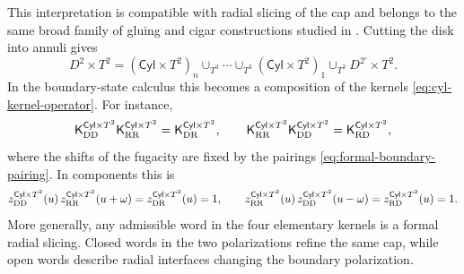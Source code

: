 \documentclass[11pt,a4paper]{article}
\numberwithin{equation}{section}
\theoremstyle{plain}
\theoremstyle{definition}
\theoremstyle{remark}
\newcommand{\cyl}{\mathsf{Cyl}}
\begin{document}
This interpretation is compatible with radial slicing of the cap and belongs to the same broad family of gluing and cigar constructions studied in \cite{Dedushenko:2018aox,Dedushenko:2018tgx,Dedushenko:2021mds,Dedushenko:2023qjq}.  Cutting the disk into annuli gives
\begin{equation}
D^2\times T^2
=
(\cyl\times T^2)_n
\cup_{T^3}\cdots\cup_{T^3}
(\cyl\times T^2)_1
\cup_{T^3}
D^{2\prime}\times T^2.
\label{eq:radial-slicing-cap}
\end{equation}
In the boundary-state calculus this becomes a composition of the kernels \eqref{eq:cyl-kernel-operator}.  For instance,
\begin{equation}
\mathsf K_{\rm DD}^{\cyl\times T^2}\mathsf K_{\rm RR}^{\cyl\times T^2}
=
\mathsf K_{\rm DR}^{\cyl\times T^2},
\qquad
\mathsf K_{\rm RR}^{\cyl\times T^2}\mathsf K_{\rm DD}^{\cyl\times T^2}
=
\mathsf K_{\rm RD}^{\cyl\times T^2},
\label{eq:cyl-kernel-composition}
\end{equation}
where the shifts of the fugacity are fixed by the pairings \eqref{eq:formal-boundary-pairing}.  In components this is
\begin{equation}
z_{\rm DD}^{\cyl\times T^2}(u)\,
z_{\rm RR}^{\cyl\times T^2}(u+\omega)
=
z_{\rm DR}^{\cyl\times T^2}(u)=1,
\qquad
z_{\rm RR}^{\cyl\times T^2}(u)\,
z_{\rm DD}^{\cyl\times T^2}(u-\omega)
=
z_{\rm RD}^{\cyl\times T^2}(u)=1.
\label{eq:cyl-kernel-component-composition}
\end{equation}
More generally, any admissible word in the four elementary kernels is a formal radial slicing.  Closed words in the two polarizations refine the same cap, while open words describe radial interfaces changing the boundary polarization.
\end{document}
